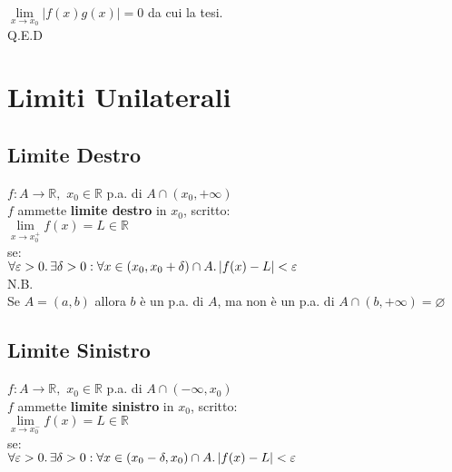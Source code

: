 \documentclass[a4paper, twoside, italian, 11pt]{book}
\newcommand{\abs}[1] {\left | #1 \right |}
\newcommand{\R}{\mathbb{R}}
\let\emptyset\varnothing
\begin{document}
$\lim\limits_{x \to x_0} \abs{f(x)g(x)} = 0$ da cui la tesi. \\

\noindent
Q.E.D



\section{Limiti Unilaterali}


\subsection{Limite Destro}

\noindent
$f : A \rightarrow \R,$ $x_0 \in \R$ p.a. di $A \cap (x_0, +\infty)$ \\

\noindent
$f$ ammette \textbf{limite destro} in $x_0$, scritto: \\

$\lim\limits_{x \to x_0^+} f(x) = L \in \R$ \\

\noindent
se: \\

$\forall \varepsilon > 0 \ldotp \exists \delta > 0 : \forall x \in (x_0, x_0 + \delta) \cap A \ldotp \abs{f(x) - L} < \varepsilon$ \\

\noindent
N.B. \\

\noindent
Se $A = (a, b)$ allora $b$ è un p.a. di $A$, ma non è un p.a. di $A \cap (b, +\infty) = \emptyset$


\subsection{Limite Sinistro}

\noindent
$f : A \rightarrow \R,$ $x_0 \in \R$ p.a. di $A \cap (-\infty, x_0)$ \\

\noindent
$f$ ammette \textbf{limite sinistro} in $x_0$, scritto: \\

$\lim\limits_{x \to x_0^-} f(x) = L \in \R$ \\

\noindent
se: \\

$\forall \varepsilon > 0 \ldotp \exists \delta > 0 : \forall x \in (x_0 - \delta, x_0) \cap A \ldotp \abs{f(x) - L} < \varepsilon$
\end{document}
